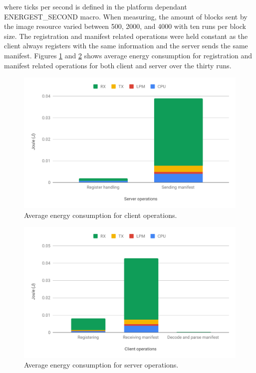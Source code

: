 \documentclass[0-thesis.tex]{subfiles}
\begin{document}
where ticks per second is defined in the platform dependant ENERGEST\_SECOND macro. When
measuring, the amount of blocks sent by the image resource varied between 500, 2000, and
4000 with ten runs per block size. The registration and manifest related operations were
held constant as the client always registers with the same information and the server
sends the same manifest. Figures \ref{fig:client-operations-energy} and
\ref{fig:server-operations-energy} shows average energy consumption for registration and
manifest related operations for both client and server over the thirty runs.

\begin{figure}
    \caption{Average energy consumption for client operations.}
    \label{fig:client-operations-energy}
    \includegraphics[scale=0.8]{images/server-operations-energy.pdf}
\end{figure}

\begin{figure}
    \caption{Average energy consumption for server operations.}
    \label{fig:server-operations-energy}
    \includegraphics[scale=0.8]{images/client-operations-energy.pdf}
\end{figure}
\end{document}
